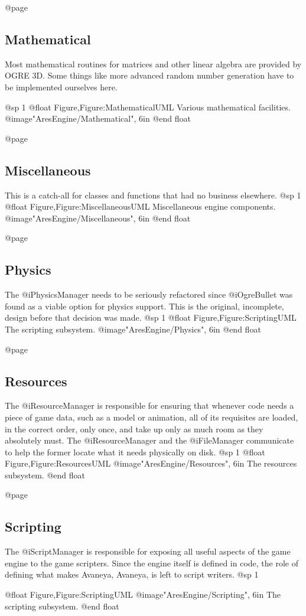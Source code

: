 @page 
\subsection{Mathematical}
Most mathematical routines for matrices and other linear algebra are provided by OGRE 3D. Some things like more advanced random number generation have to be implemented ourselves here.

@sp 1
@float Figure,Figure:MathematicalUML
Various mathematical facilities.
@image{"AresEngine/Mathematical", 6in}
@end float

@page 
\subsection{Miscellaneous}
This is a catch-all for classes and functions that had no business elsewhere.
@sp 1
@float Figure,Figure:MiscellaneousUML
Miscellaneous engine components.
@image{"AresEngine/Miscellaneous", 6in}
@end float

@page 
\subsection{Physics}
The @i{PhysicsManager} needs to be seriously refactored since @i{OgreBullet} was found as a viable option for physics support. This is the original, incomplete, design before that decision was made.
@sp 1
@float Figure,Figure:ScriptingUML
The scripting subsystem.
@image{"AresEngine/Physics", 6in}
@end float

@page 
\subsection{Resources}
The @i{ResourceManager} is responsible for ensuring that whenever code needs a piece of game data, such as a model or animation, all of its requisites are loaded, in the correct order, only once, and take up only as much room as they absolutely must. The @i{ResourceManager} and the @i{FileManager} communicate to help the former locate what it needs physically on disk.
@sp 1
@float Figure,Figure:ResourcesUML
@image{"AresEngine/Resources", 6in}
The resources subsystem.
@end float

@page 
\subsection{Scripting}
The @i{ScriptManager} is responsible for exposing all useful aspects of the game engine to the game scripters. Since the engine itself is defined in code, the role of defining what makes Avaneya, Avaneya, is left to script writers.
@sp 1

@float Figure,Figure:ScriptingUML
@image{"AresEngine/Scripting", 6in}
The scripting subsystem.
@end float

